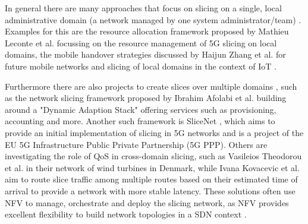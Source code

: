 \documentclass{article}
\begin{document}
In general there are many approaches that focus on slicing on a single, local administrative domain (a network managed by one system administrator/team) \cite{SD1,SD2,SD3}. Examples for this are the resource allocation framework proposed by Mathieu Leconte et al. \cite{SD3} focussing on the resource management of 5G slicing on local domains, the mobile handover strategies discussed by Haijun Zhang et al. \cite{SD1} for future mobile networks and slicing of local domains in the context of IoT \cite{SD2}.

Furthermore there are also projects to create slices over multiple domains \cite{MD1,MD2,MD3,MD4,MD5}, such as the network slicing framework proposed by Ibrahim Afolabi et al. \cite{MD1} building around a "Dynamic Adaption Stack" offering services such as provisioning, accounting and more. Another such framework is SliceNet \cite{MD3}, which aims to provide an initial implementation of slicing in 5G networks and is a project of the EU 5G Infrastructure Public Private Partnership (5G PPP). Others are investigating the role of QoS in cross-domain slicing, such as Vasileios Theodorou et al. \cite{MD4} in their network of wind turbines in Denmark, while Ivana Kovacevic et al. \cite{MD5} aim to route slice traffic among multiple routes based on their estimated time of arrival to provide a network with more stable latency. These solutions often use NFV to manage, orchestrate and deploy the slicing network, as NFV provides excellent flexibility to build network topologies in a SDN context \cite{5GSDN1,5GSDN2}.
\end{document}
